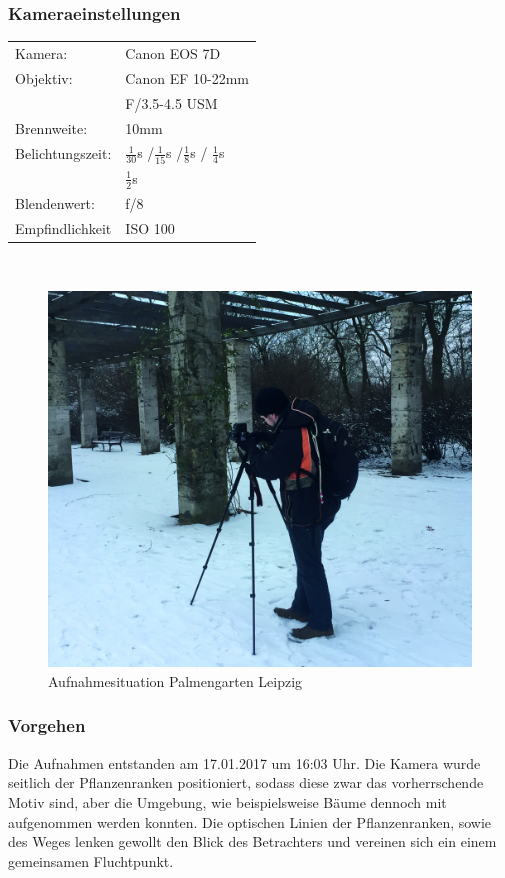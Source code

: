 \documentclass[liststotoc,bibtotoc,fontsize=14pt,]{scrreprt}
\begin{document}
\subsubsection{Kameraeinstellungen}
\begin{minipage}{0.58\textwidth}
	\begin{tabular}{ll}
		Kamera: &Canon EOS 7D \\
		Objektiv: &Canon EF 10-22mm \\
		& F/3.5-4.5 USM\\		
		Brennweite:&  10mm \\
		Belichtungszeit: & $\frac{1}{30}$s /$\frac{1}{15}$s /$\frac{1}{8}$s / $\frac{1}{4}$s \\
		& $\frac{1}{2}$s \\
		Blendenwert: & f/8\\
		Empfindlichkeit & ISO 100\\
	\end{tabular}\\
\end{minipage}%
\begin{minipage}{0.42\textwidth}
	\begin{figure}[H]
		\includegraphics[width=\linewidth]{img/places/palmen.jpg}
		\caption{Aufnahmesituation Palmengarten Leipzig}
		\label{img:ak}
	\end{figure}
\end{minipage}%


\subsubsection{Vorgehen}
Die Aufnahmen entstanden am 17.01.2017 um 16:03 Uhr. Die Kamera wurde seitlich der Pflanzenranken positioniert, sodass diese zwar das vorherrschende Motiv sind, aber die Umgebung, wie beispielsweise Bäume dennoch mit aufgenommen werden konnten. Die optischen Linien der Pflanzenranken, sowie des Weges lenken gewollt den Blick des Betrachters und vereinen sich ein einem gemeinsamen Fluchtpunkt.
\end{document}
